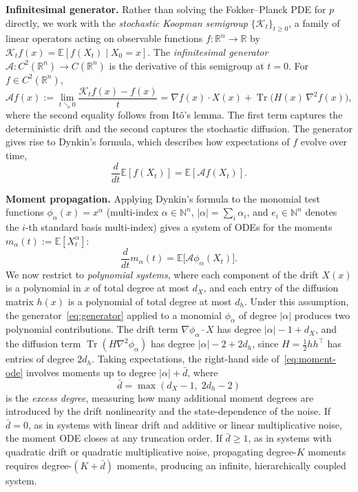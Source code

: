\documentclass{article}
\newcommand{\R}{\mathbb{R}}
\newcommand{\N}{\mathbb{N}}
\newcommand{\E}{\mathbb{E}}
\newcommand{\Tr}{\operatorname{Tr}}
\theoremstyle{definition}
\begin{document}
\textbf{Infinitesimal generator.}
Rather than solving the Fokker--Planck PDE for $p$ directly,
we work with the \emph{stochastic Koopman semigroup}
$\{\mathcal{K}_t\}_{t \ge 0}$, a family of linear operators
acting on observable functions $f \colon \R^n \to \R$ by
$\mathcal{K}_t f(x) = \E[f(X_t) \mid X_0 = x]$.
The \emph{infinitesimal generator}
$\mathcal{A} \colon C^2(\R^n) \to C(\R^n)$ is the derivative
of this semigroup at $t = 0$. For $f \in C^2(\R^n)$,
\begin{equation}\label{eq:generator}
    \mathcal{A}f(x) := \lim_{t \searrow 0}
    \frac{\mathcal{K}_t f(x) - f(x)}{t}
    = \nabla f(x) \cdot X(x) + \Tr\!\bigl(H(x)\,\nabla^2 f(x)\bigr),
\end{equation}
where the second equality follows from It\^o's lemma.
The first term captures the deterministic drift and the second
captures the stochastic diffusion.
The generator gives rise to Dynkin's formula,
which describes how expectations of $f$ evolve over time,
\begin{equation}\label{eq:dynkin}
    \frac{d}{dt}\E[f(X_t)] = \E[\mathcal{A}f(X_t)].
\end{equation}

\textbf{Moment propagation.}
Applying Dynkin's formula to the monomial test functions
$\phi_\alpha(x) = x^\alpha$ (multi-index $\alpha \in \N^n$,
$|\alpha| = \sum_i \alpha_i$, and $e_i \in \N^n$ denotes the $i$-th standard basis multi-index) gives a system of ODEs for the moments
$m_\alpha(t) := \E[X_t^\alpha]$:
\begin{equation}\label{eq:moment-ode}
    \frac{d}{dt} m_\alpha(t) = \E\bigl[\mathcal{A}\phi_\alpha(X_t)\bigr].
\end{equation}
We now restrict to \emph{polynomial systems}, where each component
of the drift $X(x)$ is a polynomial in $x$ of total degree at most $d_X$,
and each entry of the diffusion matrix $h(x)$ is a polynomial of total
degree at most $d_h$.
Under this assumption, the generator~\eqref{eq:generator}
applied to a monomial $\phi_\alpha$ of degree $|\alpha|$ produces
two polynomial contributions.
The drift term $\nabla\phi_\alpha \cdot X$ has degree
$|\alpha| - 1 + d_X$,
and the diffusion term $\Tr(H\nabla^2\phi_\alpha)$
has degree $|\alpha| - 2 + 2d_h$, since
$H = \frac{1}{2}hh^\top$ has entries of degree $2d_h$.
Taking expectations, the right-hand side of~\eqref{eq:moment-ode}
involves moments up to degree $|\alpha| + \bar{d}$, where
\begin{equation}\label{eq:dbar}
    \bar{d} = \max(d_X - 1,\; 2d_h - 2)
\end{equation}
is the \emph{excess degree}, measuring how many additional moment degrees
are introduced by the drift nonlinearity and the state-dependence of the noise.
If $\bar{d} = 0$, as in systems with linear drift and additive or
linear multiplicative noise, the moment ODE closes at any truncation order.
If $\bar{d} \ge 1$, as in systems with quadratic drift
or quadratic multiplicative noise, propagating degree-$K$ moments
requires degree-$(K{+}\bar{d})$ moments, producing an infinite, hierarchically
coupled system.
\end{document}
